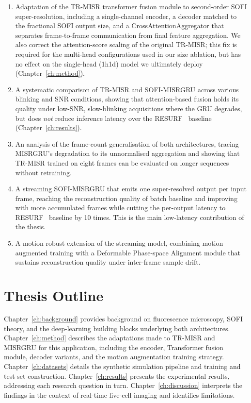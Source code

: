 \begin{enumerate}
  \item Adaptation of the TR-MISR transformer fusion module to second-order SOFI
    super-resolution, including a single-channel encoder, a decoder matched to the fractional
    SOFI output size, and a CrossAttentionAggregator that separates frame-to-frame
    communication from final feature aggregation. We also correct the attention-score scaling
    of the original TR-MISR; this fix is required for the multi-head configurations used in
    our size ablation, but has no effect on the single-head (1h1d) model we ultimately deploy
    (Chapter~\ref{ch:method}).
  \item A systematic comparison of TR-MISR and SOFI-MISRGRU across various blinking and
    SNR conditions, showing that attention-based fusion holds its quality under low-SNR,
    slow-blinking acquisitions where the GRU degrades, but does \emph{not} reduce inference
    latency over the RESURF~\cite{resurf2024} baseline (Chapter~\ref{ch:results}).
  \item An analysis of the frame-count generalisation of both architectures, tracing
    MISRGRU's degradation to its unnormalised aggregation and showing that TR-MISR trained on
    eight frames can be evaluated on longer sequences without retraining.
  \item A streaming SOFI-MISRGRU that emits one super-resolved output per input frame,
    reaching the reconstruction quality of batch baseline and improving with more accumulated
    frames while cutting the per-output latency to RESURF~\cite{resurf2024} baseline by 10 times.
    This is the main low-latency contribution of the thesis.
  \item A motion-robust extension of the streaming model, combining motion-augmented training with
    a Deformable Phase-space Alignment module that sustains reconstruction quality under
    inter-frame sample drift. 
\end{enumerate}

\section{Thesis Outline}

Chapter~\ref{ch:background} provides background on fluorescence microscopy, SOFI
theory, and the deep-learning building blocks underlying both architectures.
Chapter~\ref{ch:method} describes the adaptations made to TR-MISR and MISRGRU
for this application, including the encoder, Transformer fusion module, decoder
variants, and the motion augmentation training strategy.
Chapter~\ref{ch:datasets} details the synthetic simulation pipeline and
training and test set construction.
Chapter~\ref{ch:results} presents the experimental results, addressing each
research question in turn.
Chapter~\ref{ch:discussion} interprets the findings in the context of real-time
live-cell imaging and identifies limitations.

